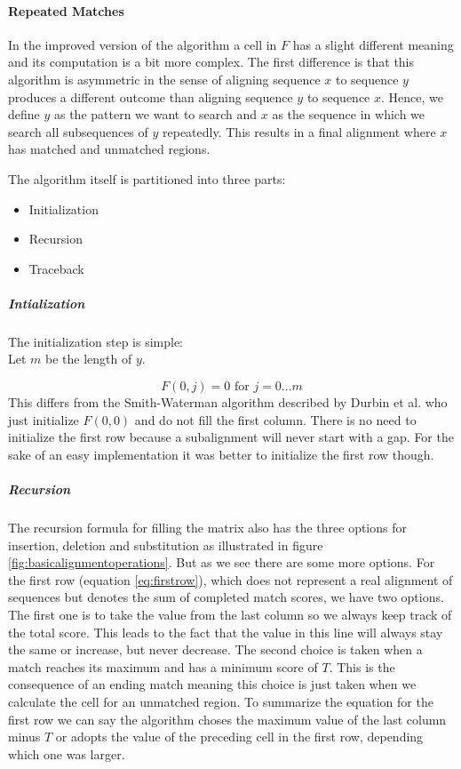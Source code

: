 \paragraph{Repeated Matches}
In the improved version of the algorithm a cell in $F$ has a slight different meaning and its computation is a bit more complex.
The first difference is that this algorithm is asymmetric in the sense of aligning sequence $x$ to sequence $y$ produces a different outcome than aligning sequence $y$ to sequence $x$.
Hence, we define $y$ as the pattern we want to search and $x$ as the sequence in which we search all subsequences of $y$ repeatedly.
This results in a final alignment where $x$ has matched and unmatched regions.

The algorithm itself is partitioned into three parts:

\begin{itemize}
	\item Initialization
	\item Recursion
	\item Traceback
\end{itemize}

\subparagraph{Intialization}
	The initialization step is simple: \\
	Let $m$ be the length of $y$.

	\begin{equation*}
		F(0,j) = 0 \text{ for } j=0\dotsc m
	\end{equation*}
	This differs from the Smith-Waterman algorithm described by Durbin et al.\cite{durbin1998} who just initialize $F(0,0)$ and do not fill the first column. There is no need to initialize the first row because a subalignment will never start with a gap. For the sake of an easy implementation it was better to initialize the first row though.

\subparagraph{Recursion}
The recursion formula for filling the matrix also has the three options for insertion, deletion and substitution as illustrated in figure \ref{fig:basicalignmentoperations}.
But as we see there are some more options.
For the first row (equation \ref{eq:firstrow}), which does not represent a real alignment of sequences but denotes the sum of completed match scores, we have two options.
The first one is to take the value from the last column so we always keep track of the total score.
This leads to the fact that the value in this line will always stay the same or increase, but never decrease.
The second choice is taken when a match reaches its maximum and has a minimum score of $T$.
This is the consequence of an ending match meaning this choice is just taken when we calculate the cell for an unmatched region.
To summarize the equation for the first row we can say the algorithm choses the maximum value of the last column minus $T$ or adopts the value of the preceding cell in the first row, depending which one was larger.

